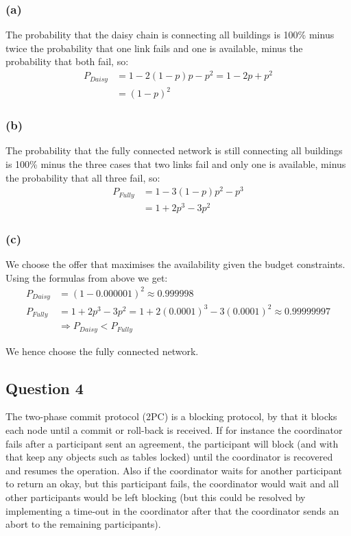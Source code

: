 \documentclass[12pt,a4paper,fleqn]{article}
\begin{document}
\subsubsection*{(a)}
The probability that the daisy chain is connecting all buildings is 100\% minus twice the probability that one link fails and one is available, minus the probability that both fail, so: 
\begin{align*}
P_{Daisy} &= 1-2(1-p)p - p^2 = 1-2p + p^2 \\
&= (1-p)^2
\end{align*}

\subsubsection*{(b)}
The probability that the fully connected network is still connecting all buildings is 100\% minus the three cases that two links fail and only one is available, minus the probability that all three fail, so:
\begin{align*}
P_{Fully} &= 1-3(1-p)p^2 - p^3 \\
&= 1 + 2p^3 - 3p^2
\end{align*}

\subsubsection*{(c)}
We choose the offer that maximises the availability given the budget constraints. Using the formulas from above we get:
\begin{align*}
P_{Daisy} &= (1-0.000001)^2 \approx 0.999998 \\
P_{Fully} &= 1 + 2p^3 - 3p^2 = 1 + 2(0.0001)^3-3(0.0001)^2 \approx 0.99999997 \\ 
&\Rightarrow P_{Daisy} < P_{Fully}
\end{align*}

We hence choose the fully connected network.

\subsection*{Question 4}
\label{sec:eq4}

The two-phase commit protocol (2PC) is a blocking protocol, by that it blocks each node until a commit or roll-back is received. If for instance the coordinator fails after a participant sent an agreement, the participant will block (and with that keep any objects such as tables locked) until the coordinator is recovered and resumes the operation. Also if the coordinator waits for another participant to return an okay, but this participant fails, the coordinator would wait and all other participants would be left blocking (but this could be resolved by implementing a time-out in the coordinator after that the coordinator sends an abort to the remaining participants). 
\end{document}
